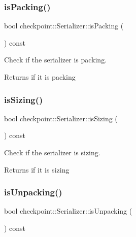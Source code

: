 \subsubsection{\texorpdfstring{is\+Packing()}{isPacking()}}
{\footnotesize\ttfamily bool checkpoint\+::\+Serializer\+::is\+Packing (\begin{DoxyParamCaption}{ }\end{DoxyParamCaption}) const\hspace{0.3cm}{\ttfamily [inline]}}



Check if the serializer is packing. 

\begin{DoxyReturn}{Returns}
if it is packing 
\end{DoxyReturn}
\mbox{\label{structcheckpoint_1_1_serializer_a27e3304ca8c9de113675b7692e5aa65f}} 
\subsubsection{\texorpdfstring{is\+Sizing()}{isSizing()}}
{\footnotesize\ttfamily bool checkpoint\+::\+Serializer\+::is\+Sizing (\begin{DoxyParamCaption}{ }\end{DoxyParamCaption}) const\hspace{0.3cm}{\ttfamily [inline]}}



Check if the serializer is sizing. 

\begin{DoxyReturn}{Returns}
if it is sizing 
\end{DoxyReturn}
\mbox{\label{structcheckpoint_1_1_serializer_a3a09ea026ff2c6ddf863f9c1a6463466}} 
\subsubsection{\texorpdfstring{is\+Unpacking()}{isUnpacking()}}
{\footnotesize\ttfamily bool checkpoint\+::\+Serializer\+::is\+Unpacking (\begin{DoxyParamCaption}{ }\end{DoxyParamCaption}) const\hspace{0.3cm}{\ttfamily [inline]}}



